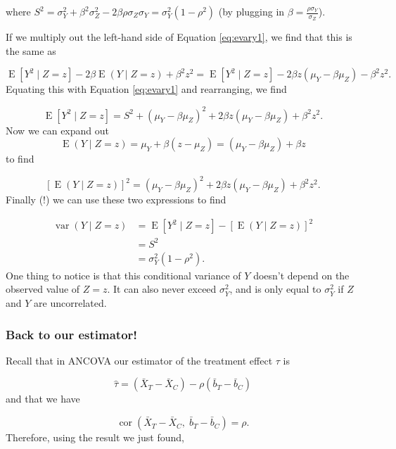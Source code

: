 \documentclass[
  openany]{book}
\theoremstyle{definition}
\theoremstyle{definition}
\theoremstyle{definition}
\theoremstyle{definition}
\theoremstyle{remark}
\begin{document}
where \(S^2 = \sigma^2_Y + \beta^2\sigma^2_Z - 2\beta\rho\sigma_Z\sigma_Y = \sigma^2_Y\left(1-\rho^2\right)\) (by plugging in \(\beta = \frac{\rho\sigma_Y}{\sigma_Z}\)).

If we multiply out the left-hand side of Equation \eqref{eq:evary1}, we find that this is the same as

\[\operatorname{E}\left[Y^2\mid{Z=z}\right] - 2\beta\operatorname{E}\left(Y\mid{Z=z}\right) + \beta^2 z^2 = \operatorname{E}\left[Y^2\mid{Z=z}\right] - 2\beta z\left(\mu_Y - \beta\mu_Z\right) - \beta^2 z^2.\]
Equating this with Equation \eqref{eq:evary1} and rearranging, we find

\[\operatorname{E}\left[Y^2\mid{Z=z}\right] = S^2 + \left(\mu_Y - \beta\mu_Z\right)^2 + 2\beta z\left(\mu_Y - \beta \mu_Z\right) + \beta^2z^2.\]
Now we can expand out
\[\operatorname{E}\left(Y\mid{Z=z}\right) = \mu_Y + \beta\left(z-\mu_Z\right) = \left(\mu_Y - \beta\mu_Z\right) +\beta z\]
to find

\[\left[\operatorname{E}\left(Y\mid{Z=z}\right) \right]^2  = \left(\mu_Y - \beta\mu_Z\right)^2 + 2\beta z \left(\mu_Y - \beta\mu_Z\right) + \beta^2 z^2.\]
Finally (!) we can use these two expressions to find

\[
\begin{aligned}
\operatorname{var}\left(Y\mid{Z=z}\right) & = \operatorname{E}\left[Y^2\mid{Z=z}\right] - \left[\operatorname{E}\left(Y\mid{Z=z}\right)\right]^2\\
& = S^2 \\
& = \sigma_Y^2\left(1-\rho^2\right).
\end{aligned}
\]
One thing to notice is that this conditional variance of \(Y\) doesn't depend on the observed value of \(Z=z\). It can also never exceed \(\sigma^2_Y\), and is only equal to \(\sigma^2_Y\) if \(Z\) and \(Y\) are uncorrelated.

\subsubsection*{Back to our estimator!}\label{back-to-our-estimator}

Recall that in ANCOVA our estimator of the treatment effect \(\tau\) is

\[ \hat{\tau} = \left(\bar{X}_T - \bar{X}_C\right) - \rho\left(\bar{b}_T - \bar{b}_C\right)\]
and that we have

\[\operatorname{cor}\left(\bar{X}_T - \bar{X}_C,\; \bar{b}_T - \bar{b}_C\right) = \rho.\]
Therefore, using the result we just found,
\end{document}
